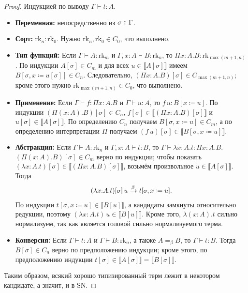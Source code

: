 \begin{proof}
Индукцией по выводу \(\Gamma\vdash t:A\).
\begin{itemize}
\item \textbf{Переменная:} непосредственно из
    \(\sigma\dblcolon\Gamma\).
\item \textbf{Сорт:} \(\mathrm{rk}_n:\mathrm{rk}_0\).
    Нужно \(\mathrm{rk}_n,\mathrm{rk}_0\in C_0\), что
    выполнено.
\item \textbf{Тип функций:} Если
    \(\Gamma\vdash A:\mathrm{rk}_m\) и
    \(\Gamma,x:A\vdash B:\mathrm{rk}_n\), то
    \(\Pi x{:}A.B:\mathrm{rk}_{\max(m+1,n)}\). По
    индукции \(A[\sigma]\in C_m\) и для
    всех \(u\in\llbracket A[\sigma]\rrbracket\) имеем
    \(B[\sigma, x\coloneqq u[\sigma]]\in C_n\).
    Следовательно,
    \((\Pi x{:}A.B)[\sigma]\in C_{\max(m+1,n)}\); 
    кроме этого нужно
    $\mathrm{rk}_{\max(m+1,n)}\in C_0$, что выполнено.
\item \textbf{Применение:} Если \(\Gamma\vdash f:\Pi x{:}A.B\) и
    \(\Gamma\vdash u:A\), то \(f\,u:B[x\coloneqq u]\).
    По индукции \((\Pi(x:A).B)[\sigma]\in C_n\),
    \(f[\sigma]\in\llbracket (\Pi x{:}A.B)[\sigma]
        \rrbracket\) и
    \(u[\sigma]\in\llbracket A[\sigma]\rrbracket\).
    По определению $C_n$ получаем
    $B[\sigma,x\coloneqq u]\in C_m$, а по
    определению интерпретации \(\Pi\) получаем
    \((f\,u)[\sigma]\in\llbracket
        B[\sigma,x\coloneqq u]\rrbracket\).
\item \textbf{Абстракция:} Если
    \(\Gamma\vdash A:\mathrm{rk}_n\) и
    \(\Gamma,x:A\vdash t:B\), то
    \(\Gamma\vdash\lambda x{:}A.t:\Pi x{:}A.B\).
    $(\Pi(x:A).B)[\sigma]\in C_m$ верно по индукции;
    чтобы показать
    \((\lambda x{:}A.t)[\sigma]\in\llbracket
    (\Pi x{:}A.B)[\sigma]\rrbracket\), возьмём
    произвольное
    \(u\in\llbracket A[\sigma]\rrbracket\). Тогда
\[ (\lambda x{:}A.t)[\sigma]\,u \xrightarrow{\beta}
        t[\sigma, x\coloneqq u]. \]
По индукции \(t[\sigma,x\coloneqq u]\in\llbracket B[u]
\rrbracket\), а кандидаты замкнуты относительно
редукции, поэтому
\((\lambda x{:}A.t)\,u\in\llbracket B[u]\rrbracket\).
Кроме того, $\lambda(x:A).t$ сильно нормализуем, так
как является головой сильно нормализуемого терма.
\item \textbf{Конверсия:} Если $\Gamma\vdash t:A$ и
$\Gamma\vdash B:\mathrm{rk}_n$, а также $A =_\beta B$,
то $\Gamma\vdash t:B$. Тогда $B[\sigma] \in C_n$ верно
по предположению индукции; кроме этого, по
предположению индукции
$t[\sigma]\in\llbracket A[\sigma]\rrbracket =
\llbracket B[\sigma] \rrbracket$.
\end{itemize}
Таким образом, всякий хорошо типизированный терм лежит в некотором кандидате, а
значит, и в \(\mathrm{SN}\).
\end{proof}

